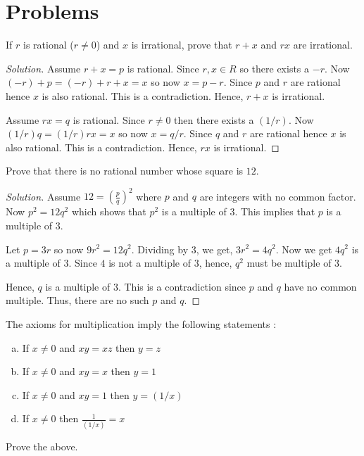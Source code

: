 

\chapter*{Problems}

\bigbreak

\begin{prblm}
    If $r$ is rational ($r \neq 0$) and $x$ is irrational, prove that $r + x$ and $rx$ are irrational.
\end{prblm}

\begin{proof}[Solution]
    Assume $r + x = p$ is rational. Since $r, x \in R$ so there exists a $-r$. 
    Now $(-r) + p = (-r) + r + x = x$ so now $x = p - r$. Since $p$ and $r$ are rational hence $x$ is also rational.
    This is a contradiction. Hence, $r + x$ is irrational.

    Assume $rx = q$ is rational. Since $r \neq 0$ then there exists a $(1/r)$.
    Now $(1/r)q = (1/r)rx = x$ so now $x = q/r$. Since $q$ and $r$ are rational hence $x$ is also rational.
    This is a contradiction. Hence, $rx$ is irrational.
\end{proof}

\begin{prblm}
    Prove that there is no rational number whose square is $12$.
\end{prblm}

\begin{proof}[Solution]
    Assume $12 = \left( \frac{p}{q} \right)^2$ where $p$ and $q$ are integers with no common factor.
    Now $p^2 = 12q^2$ which shows that $p^2$ is a multiple of $3$. 
    This implies that $p$ is a multiple of $3$. 
    
    Let $p = 3r$ so now $9r^2 = 12q^2$.
    Dividing by $3$, we get, $3r^2 = 4q^2$. Now we get $4q^2$ is a multiple of $3$.
    Since $4$ is not a multiple of $3$, hence, $q^2$ must be multiple of $3$. 
    
    Hence, $q$ is a multiple of $3$. This is a contradiction since $p$ and $q$ have no common multiple.
    Thus, there are no such $p$ and $q$.

\end{proof}

\begin{prblm}
    The axioms for multiplication imply the following statements : 
    \begin{enumerate}[a)]
        \item If $x \neq 0$ and $xy = xz$  then $y = z$
        \item If $x \neq 0$ and $xy = x$ then $y = 1$
        \item If $x \neq 0$ and $xy = 1$ then $y = (1/x)$
        \item If $x \neq 0$ then $\frac{1}{(1/x)}= x$
    \end{enumerate}
    Prove the above.
\end{prblm}

